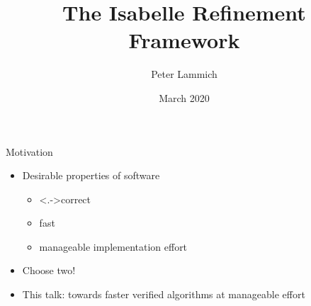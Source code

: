 \documentclass[fleqn]{beamer}
\title{The Isabelle Refinement Framework}
\author[Peter Lammich]{Peter Lammich}
\institute[UoM] %
{ The University of Manchester}
\date {March 2020}
\begin{document}
% 

\begin{frame}
  \titlepage
\end{frame}


\newcommand{\insertsectitle}{}

\setbeamertemplate{frametitle}{\vspace{.7em}\insertframetitle\hfill \small\raisebox{10pt}{\insertsectitle}}

\begin{frame}{Motivation}

  \begin{itemize}
   \item<+-> Desirable properties of software
    \begin{itemize}
     \item<+-> \onslide<.->{correct}
     \item<+-> fast
     \item<+-> manageable implementation effort
    \end{itemize}
   \item<+-> Choose two!
   \item<+-> This talk: towards faster verified algorithms at manageable effort

  \end{itemize}
\end{frame}
\def\algoAugment{
  \begin{algorithmic}
    \Procedure{augment}{$g,f,p$}
      \State{$c_p \gets \min\{ g_f(u,v) \mid (u,v)\in p \}$}
      \ForAll{$(u,v)\in p$}
        \If{$(u,v)\in g$}~$f(u,v)\gets f(u,v) + c_p$
        \Else~$f(v,u)\gets f(v,u) - c_p$
        \EndIf
      \EndFor
      \Return{$f$}
    \EndProcedure
  \end{algorithmic}
}

\def\algoEdka{
  \begin{algorithmic}
    \Procedure{Edmonds-Karp}{$g,s,t$}
      \State{$f\gets \lambda(u,v).~0$}
      \While{exists augmenting path in $g_f$}
        \State{$p \gets {}$ shortest augmenting path}
        \State{$f \gets $\Call{augment}{$g,f,p$}}
      \EndWhile
    \EndProcedure
  \end{algorithmic}
}
\end{document}
